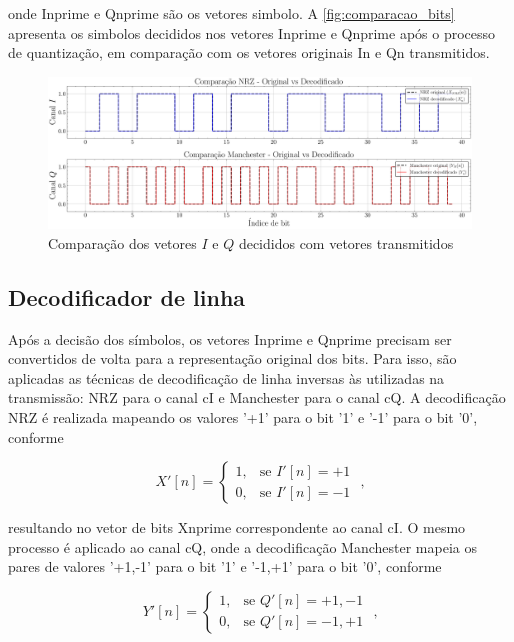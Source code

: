 \noindent onde \gls{Inprime} e \gls{Qnprime} são os vetores simbolo. A \autoref{fig:comparacao_bits} apresenta os simbolos decididos nos vetores \gls{Inprime} e \gls{Qnprime} após o processo de quantização, em comparação com os vetores originais \gls{In} e \gls{Qn} transmitidos.

\begin{figure}[H]
	\centering
	\caption{Comparação dos vetores $I$ e $Q$ decididos com vetores transmitidos}\label{fig:comparacao_bits}
	\includegraphics[width=\linewidth]{assets/cap2/comparacao_bits.pdf}
\end{figure}

\subsection{Decodificador de linha}

Após a decisão dos símbolos, os vetores \gls{Inprime} e \gls{Qnprime} precisam ser convertidos de volta para a representação original dos bits. Para isso, são aplicadas as técnicas de decodificação de linha inversas às utilizadas na transmissão: \gls{NRZ} para o canal \gls{cI} e \gls{Manchester} para o canal \gls{cQ}. A decodificação \gls{NRZ} é realizada mapeando os valores '+1' para o bit '1' e '-1' para o bit '0', conforme

\begin{equation}
    X'[n] = 
    \begin{cases}
    1, & \text{se } I'[n] = +1 \\
    0, & \text{se } I'[n] = -1
    \end{cases} \text{ ,}
\end{equation}


\noindent resultando no vetor de bits \gls{Xnprime} correspondente ao canal \gls{cI}. O mesmo processo é aplicado ao canal \gls{cQ}, onde a decodificação \gls{Manchester} mapeia os pares de valores '+1,-1' para o bit '1' e '-1,+1' para o bit '0', conforme

\begin{equation}
    Y'[n] = 
    \begin{cases}
    1, & \text{se } Q'[n] = +1,-1 \\
    0, & \text{se } Q'[n] = -1,+1
    \end{cases} \text{ ,}
\end{equation}

